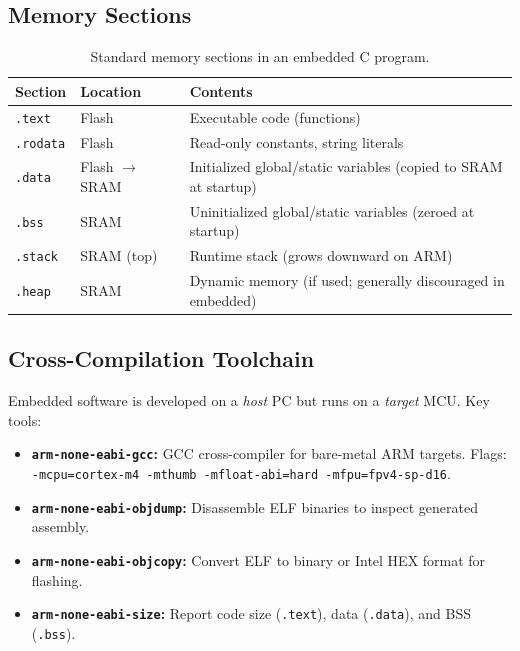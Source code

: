 \subsection{Memory Sections}

\begin{table}[H]
\centering
\caption{Standard memory sections in an embedded C program.}
\label{tab:proc:sections}
\begin{tabularx}{\textwidth}{l l X}
\toprule
\textbf{Section} & \textbf{Location} & \textbf{Contents} \\
\midrule
\texttt{.text} & Flash & Executable code (functions) \\
\texttt{.rodata} & Flash & Read-only constants, string literals \\
\texttt{.data} & Flash $\to$ SRAM & Initialized global/static variables (copied to SRAM at startup) \\
\texttt{.bss} & SRAM & Uninitialized global/static variables (zeroed at startup) \\
\texttt{.stack} & SRAM (top) & Runtime stack (grows downward on ARM) \\
\texttt{.heap} & SRAM & Dynamic memory (if used; generally discouraged in embedded) \\
\bottomrule
\end{tabularx}
\end{table}

\subsection{Cross-Compilation Toolchain}

Embedded software is developed on a \emph{host} PC but runs on a \emph{target} MCU. Key tools:
\begin{itemize}
  \item \textbf{\texttt{arm-none-eabi-gcc}:} GCC cross-compiler for bare-metal ARM targets. Flags: \texttt{-mcpu=cortex-m4 -mthumb -mfloat-abi=hard -mfpu=fpv4-sp-d16}.
  \item \textbf{\texttt{arm-none-eabi-objdump}:} Disassemble ELF binaries to inspect generated assembly.
  \item \textbf{\texttt{arm-none-eabi-objcopy}:} Convert ELF to binary or Intel HEX format for flashing.
  \item \textbf{\texttt{arm-none-eabi-size}:} Report code size (\texttt{.text}), data (\texttt{.data}), and BSS (\texttt{.bss}).
\end{itemize}

